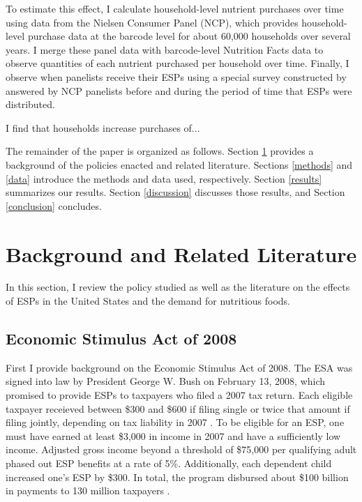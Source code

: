 \documentclass[12pt]{article}
\begin{document}
To estimate this effect, I calculate household-level nutrient purchases over time using data from the Nielsen Consumer Panel (NCP), which provides household-level purchase data at the barcode level for about 60,000 households over several years. I merge these panel data with barcode-level Nutrition Facts data to observe quantities of each nutrient purchased per household over time. Finally, I observe when panelists receive their ESPs using a special survey constructed by \textcite{broda2014economic} answered by NCP panelists before and during the period of time that ESPs were distributed.

I find that households increase purchases of...

The remainder of the paper is organized as follows. Section \ref{background} provides a background of the policies enacted and related literature. Sections \ref{methods} and \ref{data} introduce the methods and data used, respectively. Section \ref{results} summarizes our results. Section \ref{discussion} discusses those results, and Section \ref{conclusion} concludes.

\section{Background and Related Literature} \label{background}

In this section, I review the policy studied as well as the literature on the effects of ESPs in the United States and the demand for nutritious foods.

\subsection{Economic Stimulus Act of 2008} \label{2008esa}

First I provide background on the Economic Stimulus Act of 2008. The ESA was signed into law by President George W. Bush on February 13, 2008, which promised to provide ESPs to taxpayers who filed a 2007 tax return. Each eligible taxpayer receieved between \$300 and \$600 if filing single or twice that amount if filing jointly, depending on tax liability in 2007 \parencite{house2008}. To be eligible for an ESP, one must have earned at least \$3,000 in income in 2007 and have a sufficiently low income. Adjusted gross income beyond a threshold of \$75,000 per qualifying adult phased out ESP benefits at a rate of 5\%. Additionally, each dependent child increased one's ESP by \$300. In total, the program disbursed about \$100 billion in payments to 130 million taxpayers \parencite{parker2013consumer}.
\end{document}

